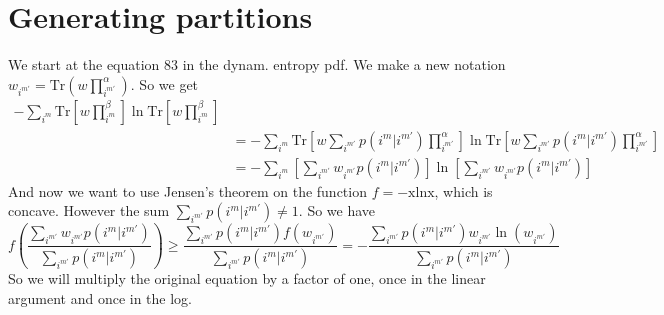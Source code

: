 \documentclass{article}
\begin{document}
\section{Generating partitions}
We start at the equation 83 in the dynam. entropy pdf. We make a new notation $w_{i^{m'}} = \text{Tr}(w\prod_{i^{m'}}^\alpha)$.  So we get
\begin{align*}
    -\sum_{i^m}\text{Tr}\left[w\prod_{i^m}^\beta\right]\ln\text{Tr}\left[w\prod_{i^m}^\beta\right]\\
    &=-\sum_{i^m}\text{Tr}\left[w\sum_{i^{m'}}p(i^m|i^{m'})\prod_{i^{m'}}^\alpha\right]\ln\text{Tr}\left[w\sum_{i^{m'}}p(i^m|i^{m'})\prod_{i^{m'}}^\alpha\right]\\
    &=-\sum_{i^m}\left[\sum_{i^{m'}}w_{i^{m'}}p(i^m|i^{m'})\right]\ln\left[\sum_{i^{m'}}w_{i^{m'}}p(i^m|i^{m'})\right]
\end{align*}
And now we want to use Jensen's theorem on the function $f = -\text{xlnx}$, which is concave. However the sum $\sum_{i^{m'}}p(i^m|i^{m'}) \neq 1$. So we have
\begin{equation}
f\left(\frac{\sum_{i^{m'}}w_{i^{m'}}p(i^m|i^{m'})}{\sum_{i^{m'}}p(i^m|i^{m'})}\right) \geq \frac{\sum_{i^{m'}}p(i^m|i^{m'})f\left(w_{i^{m'}}\right) }{\sum_{i^{m'}}p(i^m|i^{m'})} = -\frac{\sum_{i^{m'}}p(i^m|i^{m'})w_{i^{m'}}\ln\left(w_{i^{m'}}\right) }{\sum_{i^{m'}}p(i^m|i^{m'})}
\end{equation}
So we will multiply the original equation by a factor of one, once in the linear argument and once in the log. 
\end{document}
